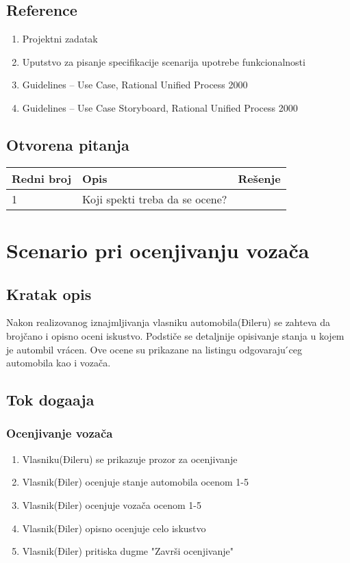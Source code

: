 \documentclass[12pt]{article}
\begin{document}
\subsection{Reference}
\begin{enumerate}
   \item Projektni zadatak
   \item Uputstvo za pisanje specifikacije scenarija upotrebe funkcionalnosti
   \item  Guidelines – Use Case, Rational Unified Process 2000
   \item  Guidelines – Use Case Storyboard, Rational Unified Process 2000
 \end{enumerate}
\subsection{Otvorena pitanja}


\begin{center}
\begin{tabular}{ | m{2cm} | m{7cm}| m{7cm} | } 
\hline
Redni broj& Opis & Rešenje \\ 
\hline
1 & Koji spekti treba da se ocene? & \\ 
\hline
\end{tabular}
\end{center}

    

\section{Scenario pri ocenjivanju vozača}
\subsection{Kratak opis}
Nakon realizovanog iznajmljivanja vlasniku automobila(Đileru) se zahteva da brojčano i
opisno oceni iskustvo. Podstiče se detaljnije opisivanje stanja u kojem je autombil
vrácen. Ove ocene su prikazane na listingu odgovaraju ́ceg automobila kao i vozača.
\subsection{Tok doga\dj aja}

\subsubsection{Ocenjivanje vozača}
\begin{enumerate}
  \item Vlasniku(Đileru) se prikazuje prozor za ocenjivanje
  \item Vlasnik(Điler) ocenjuje stanje automobila ocenom 1-5
  \item Vlasnik(Điler) ocenjuje vozača ocenom 1-5
  \item Vlasnik(Điler) opisno ocenjuje celo iskustvo
  \item Vlasnik(Điler) pritiska dugme "Završi ocenjivanje"
\end{enumerate}
\end{document}
